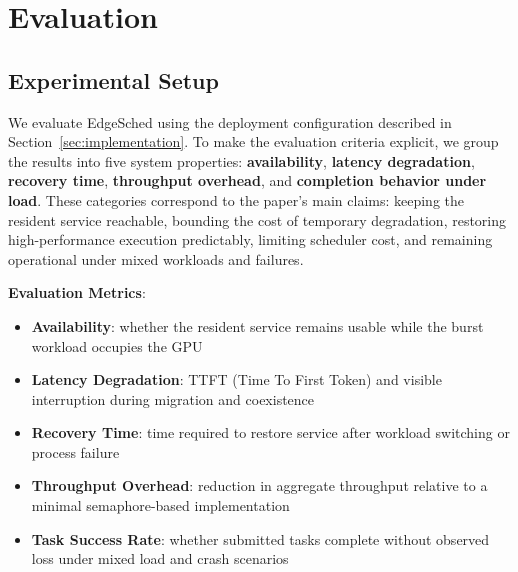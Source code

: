 \section{Evaluation}

\subsection{Experimental Setup}

We evaluate EdgeSched using the deployment configuration described in Section~\ref{sec:implementation}. To make the evaluation criteria explicit, we group the results into five system properties: \textbf{availability}, \textbf{latency degradation}, \textbf{recovery time}, \textbf{throughput overhead}, and \textbf{completion behavior under load}. These categories correspond to the paper's main claims: keeping the resident service reachable, bounding the cost of temporary degradation, restoring high-performance execution predictably, limiting scheduler cost, and remaining operational under mixed workloads and failures.

\textbf{Evaluation Metrics}:
\begin{itemize}
\item \textbf{Availability}: whether the resident service remains usable while the burst workload occupies the GPU
\item \textbf{Latency Degradation}: TTFT (Time To First Token) and visible interruption during migration and coexistence
\item \textbf{Recovery Time}: time required to restore service after workload switching or process failure
\item \textbf{Throughput Overhead}: reduction in aggregate throughput relative to a minimal semaphore-based implementation
\item \textbf{Task Success Rate}: whether submitted tasks complete without observed loss under mixed load and crash scenarios
\end{itemize}

